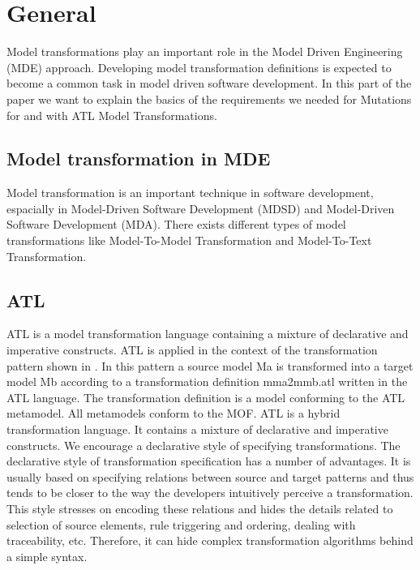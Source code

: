 \documentclass{llncs}
\begin{document}
\section{General}

Model transformations play an important role in the Model Driven Engineering
(MDE) approach. Developing model transformation definitions is expected to
become a common task in model driven software development. \cite{atl:frederic}
In this part of the paper we want to explain the basics of the requirements we needed for Mutations for and with ATL Model Transformations.

\subsection{Model transformation in MDE}
Model transformation is an important technique in software development, espacially in Model-Driven Software Development (MDSD) and Model-Driven Software Development (MDA). There exists different types of model transformations like Model-To-Model Transformation and Model-To-Text Transformation.  

\subsection{ATL}
ATL is a model transformation language containing a mixture of declarative and
imperative constructs. ATL is applied in the context of the
transformation pattern shown in \label{fig:overview_atl}. In this pattern a source model Ma is transformed into a target model Mb according to a transformation definition mma2mmb.atl written in the ATL language. The transformation definition is a model conforming to the ATL metamodel. All metamodels conform to the MOF.
ATL is a hybrid transformation language. It contains a mixture of declarative
and imperative constructs. We encourage a declarative style of specifying transformations. The declarative style of transformation specification has a number of advantages. It is usually based on specifying relations between source and target patterns and thus tends to be closer to the way the developers intuitively perceive a transformation. This style stresses on encoding these relations and hides the details related to selection of source elements, rule triggering and ordering, dealing with traceability, etc. Therefore, it can hide complex transformation algorithms behind a simple syntax.\cite{atl:frederic}
\end{document}
